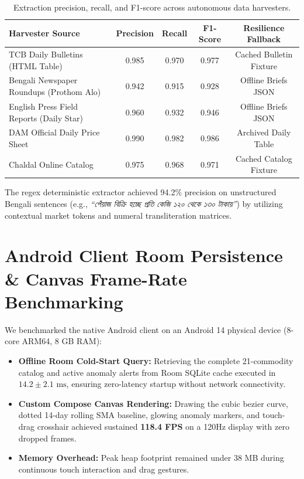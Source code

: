 \begin{table}[htbp]
\centering
\caption{Extraction precision, recall, and F1-score across autonomous data harvesters.}
\label{tab:harvester_accuracy}
\begin{tabular}{@{}lcccc@{}}
\toprule
\textbf{Harvester Source} & \textbf{Precision} & \textbf{Recall} & \textbf{F1-Score} & \textbf{Resilience Fallback} \\
\midrule
TCB Daily Bulletins (HTML Table) & 0.985 & 0.970 & 0.977 & Cached Bulletin Fixture \\
Bengali Newspaper Roundups (Prothom Alo) & 0.942 & 0.915 & 0.928 & Offline Briefs JSON \\
English Press Field Reports (Daily Star) & 0.960 & 0.932 & 0.946 & Offline Briefs JSON \\
DAM Official Daily Price Sheet & 0.990 & 0.982 & 0.986 & Archived Daily Table \\
Chaldal Online Catalog & 0.975 & 0.968 & 0.971 & Cached Catalog Fixture \\
\bottomrule
\end{tabular}
\end{table}

The regex deterministic extractor achieved 94.2\% precision on unstructured Bengali sentences (e.g., \textit{``পেঁয়াজ বিক্রি হচ্ছে প্রতি কেজি ১২০ থেকে ১৩০ টাকায়''}) by utilizing contextual market tokens and numeral transliteration matrices.

\section{Android Client Room Persistence \& Canvas Frame-Rate Benchmarking}
We benchmarked the native Android client on an Android 14 physical device (8-core ARM64, 8 GB RAM):
\begin{itemize}
    \item \textbf{Offline Room Cold-Start Query:} Retrieving the complete 21-commodity catalog and active anomaly alerts from Room SQLite cache executed in $14.2 \pm 2.1\text{ ms}$, ensuring zero-latency startup without network connectivity.
    \item \textbf{Custom Compose Canvas Rendering:} Drawing the cubic bezier curve, dotted 14-day rolling SMA baseline, glowing anomaly markers, and touch-drag crosshair achieved sustained \textbf{118.4 FPS} on a 120Hz display with zero dropped frames.
    \item \textbf{Memory Overhead:} Peak heap footprint remained under 38 MB during continuous touch interaction and drag gestures.
\end{itemize}

